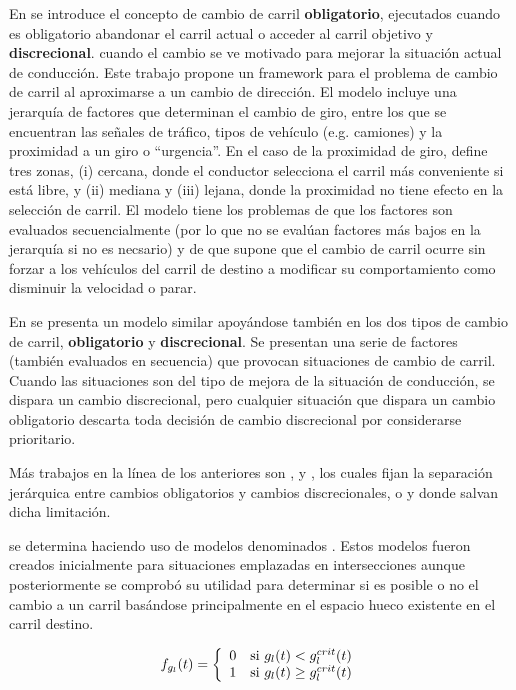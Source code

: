 En \cite{Gipps1986} se introduce el concepto de cambio de carril \textbf{obligatorio}, ejecutados cuando es obligatorio abandonar el carril actual o acceder al carril objetivo y \textbf{discrecional}. cuando el cambio se ve motivado para mejorar la situación actual de conducción. Este trabajo propone un framework para el problema de cambio de carril al aproximarse a un cambio de dirección. El modelo incluye una jerarquía de factores que determinan el cambio de giro, entre los que se encuentran las señales de tráfico, tipos de vehículo (e.g. camiones) y la proximidad a un giro o \enquote{urgencia}. En el caso de la proximidad de giro, define tres zonas, (i) cercana, donde el conductor selecciona el carril más conveniente si está libre, y (ii) mediana y (iii) lejana, donde la proximidad no tiene efecto en la selección de carril. El modelo tiene los problemas de que los factores son evaluados secuencialmente (por lo que no se evalúan factores más bajos en la jerarquía si no es necsario) y de que supone que el cambio de carril ocurre sin forzar a los vehículos del carril de destino a modificar su comportamiento como disminuir la velocidad o parar.

En \cite{Hidas2002} se presenta un modelo similar apoyándose también en los dos tipos de cambio de carril, \textbf{obligatorio} y \textbf{discrecional}. Se presentan una serie de factores (también evaluados en secuencia) que provocan situaciones de cambio de carril. Cuando las situaciones son del tipo de mejora de la situación de conducción, se dispara un cambio discrecional, pero cualquier situación que dispara un cambio obligatorio descarta toda decisión de cambio discrecional por considerarse prioritario.

Más trabajos en la línea de los anteriores son \cite{Halati1997}, \cite{Yang1996} y \cite{Ahmed1999}, los cuales fijan la separación jerárquica entre cambios obligatorios y cambios discrecionales, o \cite{Toledo2003} y \cite{Wei2000} donde salvan dicha limitación.

 se determina haciendo uso de modelos denominados \textit{}. Estos modelos fueron creados inicialmente para situaciones emplazadas en intersecciones aunque posteriormente se comprobó su utilidad para determinar si es posible o no el cambio a un carril basándose principalmente en el espacio hueco existente en el carril destino.

\begin{equation}
	f_{g_l}(t) = \twopartf {0} {g_l(t) < g^{crit}_l(t)} {1} {g_l(t) \geq g^{crit}_l(t)}
	\label{eq:gap-acceptance-model}
\end{equation}

